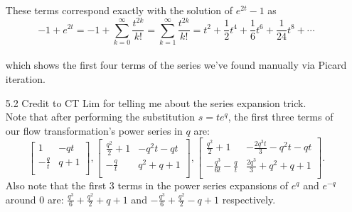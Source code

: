\documentclass[12pt, letterpaper]{article}
\begin{document}
\begin{enumerate}
\begin{enumerate}
		\end{enumerate}
		These terms correspond exactly with the solution of $e^{2t} -1$ as 
		$$ -1 + e^{2t} = -1 + \sum_{k=0}^\infty \frac{t^{2k}}{k!} = \sum_{k=1}^\infty \frac{t^{2k}}{k!} = t^2 + \frac{1}{2}t^4 + \frac{1}{6} t^6 + \frac{1}{24} t^8 + \cdots $$\\
		which shows the first four terms of the series we've found manually via Picard iteration.
		\item[5.2] Credit to CT Lim for telling me about the series expansion trick.\\
		Note that after performing the substitution $s=t e^q$, the first three terms of our flow transformation's power series in $q$ are: $$\begin{bmatrix}
		1 & -q t \\
 -\frac{q}{t} & q+1 \\
\end{bmatrix},
\begin{bmatrix}
		 \frac{q^2}{2}+1 & -q^2 t-q t \\
 -\frac{q}{t} & q^2+q+1 \\
\end{bmatrix},
\begin{bmatrix}
 \frac{q^2}{2}+1 & -\frac{2 q^3 t}{3}-q^2 t-q t \\
 -\frac{q^3}{6 t}-\frac{q}{t} & \frac{2 q^3}{3}+q^2+q+1 \\
\end{bmatrix}.
 $$
 Also note that the first 3 terms in the power series expansions of $e^q$ and $e^{-q}$ around 0 are:
 $
 \frac{q^3}{6}+\frac{q^2}{2}+q+1
 $
		and
 $
 -\frac{q^3}{6}+\frac{q^2}{2}-q+1
 $ respectively.  
\end{enumerate}
\end{document}
